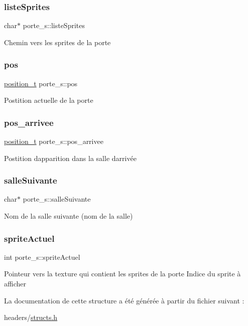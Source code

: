 \subsubsection{\texorpdfstring{liste\+Sprites}{listeSprites}}
{\footnotesize\ttfamily char$\ast$ porte\+\_\+s\+::liste\+Sprites}

Chemin vers les sprites de la porte \mbox{\label{structporte__s_a9e3c1bbfc207fb5ae26ed3c348ae9602}} 
\subsubsection{\texorpdfstring{pos}{pos}}
{\footnotesize\ttfamily \hyperlink{structposition__s}{position\+\_\+t} porte\+\_\+s\+::pos}

Postition actuelle de la porte \mbox{\label{structporte__s_a5f0b093b4c08255187a3dd261ff9e638}} 
\subsubsection{\texorpdfstring{pos\+\_\+arrivee}{pos\_arrivee}}
{\footnotesize\ttfamily \hyperlink{structposition__s}{position\+\_\+t} porte\+\_\+s\+::pos\+\_\+arrivee}

Postition d\textquotesingle{}apparition dans la salle d\textquotesingle{}arrivée \mbox{\label{structporte__s_ae89eb735de3e232b85236a603bf004d4}} 
\subsubsection{\texorpdfstring{salle\+Suivante}{salleSuivante}}
{\footnotesize\ttfamily char$\ast$ porte\+\_\+s\+::salle\+Suivante}

Nom de la salle suivante (nom de la salle) \mbox{\label{structporte__s_af7204aec8f2a5b1641986d70aa74e077}} 
\subsubsection{\texorpdfstring{sprite\+Actuel}{spriteActuel}}
{\footnotesize\ttfamily int porte\+\_\+s\+::sprite\+Actuel}

Pointeur vers la texture qui contient les sprites de la porte Indice du sprite à afficher 

La documentation de cette structure a été générée à partir du fichier suivant \+:\begin{DoxyCompactItemize}
\item 
headers/\hyperlink{structs_8h}{structs.\+h}\end{DoxyCompactItemize}
